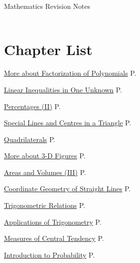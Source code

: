 \documentclass[12pt, a4paper]{article}
\begin{document}
\newpage
\newpage
\thispagestyle{empty}
\begin{center}
Mathematics Revision Notes\\\vspace{1cm}
\greybox{\fontsize{24pt}{24pt}\selectfont {S3 Chapters}} \\\vspace{1cm}
\end{center}
\vspace{0.5cm}
\hline
\section*{Chapter List}
\begin{enumx}[label=Ch \arabic*. , leftmargin=2cm,rightmargin=0pt,labelwidth=17mm, itemsep=3pt, topsep=3mm, labelsep=2mm, labelindent=0pt, align=left, partopsep=0mm ]
\item \hyperref[chapter:S3-1]{More about Factorization of Polynomials} \hfill P.\pageref{chapter:S3-1}
\item \hyperref[chapter:S3-2]{Linear Inequalities in One Unknown} \hfill P.\pageref{chapter:S3-2}
\item \hyperref[chapter:S3-3]{Percentages (II)} \hfill P.\pageref{chapter:S3-3}
\item \hyperref[chapter:S3-4]{Special Lines and Centres in a Triangle} \hfill P.\pageref{chapter:S3-4}
\item \hyperref[chapter:S3-5]{Quadrilaterals} \hfill P.\pageref{chapter:S3-5}
\item \hyperref[chapter:S3-6]{More about 3-D Figures} \hfill P.\pageref{chapter:S3-6}
\item \hyperref[chapter:S3-7]{Areas and Volumes (III)} \hfill P.\pageref{chapter:S3-7}
\item \hyperref[chapter:S3-8]{Coordinate Geometry of Straight Lines} \hfill P.\pageref{chapter:S3-8}
\item \hyperref[chapter:S3-9]{Trigonometric Relations} \hfill P.\pageref{chapter:S3-9}
\item \hyperref[chapter:S3-10]{Applications of Trigonometry} \hfill P.\pageref{chapter:S3-10}
\item \hyperref[chapter:S3-11]{Measures of Central Tendency} \hfill P.\pageref{chapter:S3-11}
\item \hyperref[chapter:S3-12]{Introduction to Probability} \hfill P.\pageref{chapter:S3-12}
\end{enumx}
\end{document}
